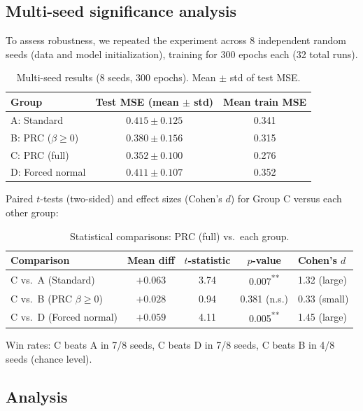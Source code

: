 \documentclass[11pt,a4paper]{article}
\theoremstyle{definition}
\begin{document}
\subsection{Multi-seed significance analysis}

To assess robustness, we repeated the experiment across 8 independent
random seeds (data and model initialization), training for 300 epochs each
(32 total runs).

\begin{table}[h]
\centering
\caption{Multi-seed results (8 seeds, 300 epochs). Mean $\pm$ std of test MSE.}
\label{tab:results-multi}
\begin{tabular}{@{}lcc@{}}
\toprule
Group & Test MSE (mean $\pm$ std) & Mean train MSE \\
\midrule
A: Standard       & $0.415 \pm 0.125$ & 0.341 \\
B: PRC ($\beta \geq 0$) & $0.380 \pm 0.156$ & 0.315 \\
C: PRC (full)     & $\mathbf{0.352 \pm 0.100}$ & 0.276 \\
D: Forced normal  & $0.411 \pm 0.107$ & 0.352 \\
\bottomrule
\end{tabular}
\end{table}

Paired $t$-tests (two-sided) and effect sizes (Cohen's $d$) for Group C
versus each other group:

\begin{table}[h]
\centering
\caption{Statistical comparisons: PRC (full) vs.\ each group.}
\label{tab:significance}
\begin{tabular}{@{}lcccl@{}}
\toprule
Comparison & Mean diff & $t$-statistic & $p$-value & Cohen's $d$ \\
\midrule
C vs.\ A (Standard)      & $+0.063$ & 3.74 & 0.007\textsuperscript{**} & 1.32 (large) \\
C vs.\ B (PRC $\beta \geq 0$) & $+0.028$ & 0.94 & 0.381 (n.s.) & 0.33 (small) \\
C vs.\ D (Forced normal) & $+0.059$ & 4.11 & 0.005\textsuperscript{**} & 1.45 (large) \\
\bottomrule
\end{tabular}
\end{table}

Win rates: C beats A in 7/8 seeds, C beats D in 7/8 seeds, C beats B in 4/8
seeds (chance level).

\subsection{Analysis}
\end{document}
